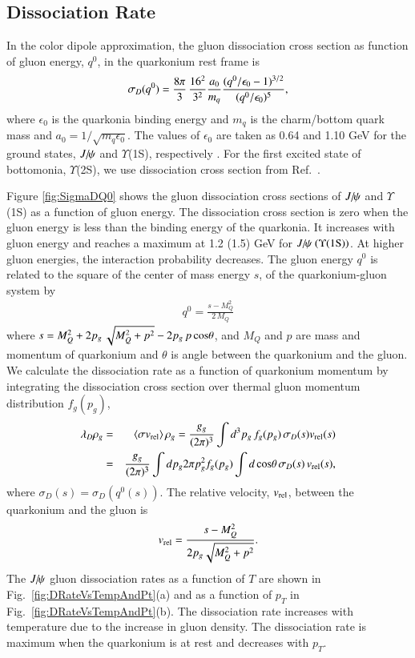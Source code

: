 \documentclass[review]{elsarticle}
\newcommand{\Jpsi}{\ensuremath{J\hspace{-.08em}/\hspace{-.14em}\psi}\xspace} %
\begin{document}
{  \subsection{Dissociation Rate}
  In the color dipole approximation, the gluon dissociation cross section as function of gluon energy, $q^0$,
  in the quarkonium rest frame is~\cite{Bhanot:1979vb}
  \begin{equation}
    \sigma_{D}(q^{0}) = {8\pi \over 3} \, {16^2 \over 3^2} {a_0 \over m_q}  \frac{(q^0/\epsilon_0 - 1)^{3/2}} {(q^0/\epsilon_0)^5},
  \end{equation}
  where $\epsilon_0$ is the quarkonia binding energy and $m_q$ is the charm/bottom quark mass 
  and $a_0=1/\sqrt{m_q\epsilon_0}$.
  The values of $\epsilon_0$ are taken as 0.64 and 1.10 GeV for the ground states, $\Jpsi$ and $\Upsilon$(1S),
  respectively \cite{Karsch:1987pv}.
  For the first excited state of bottomonia, $\Upsilon$(2S), we use dissociation
  cross section from Ref.~\cite{Arleo:2001mp}.
  
  Figure \ref{fig:SigmaDQ0} shows the gluon dissociation cross sections of $\Jpsi$ and $\Upsilon$(1S)
  as a function of gluon energy. The dissociation cross section is zero when the gluon energy is less 
  than the binding energy of the quarkonia. It increases with gluon energy and reaches a maximum at 1.2 (1.5) GeV for 
  $\Jpsi~(\Upsilon(1{\rm S}))$. At higher gluon energies, the interaction probability decreases. The gluon energy $q^0$ 
  is related to the square of the center of mass energy $s$, of the quarkonium-gluon system by
  \begin{eqnarray}
    q^{0} = \frac{s-M_{Q}^{2}}{2\,M_{Q}}
  \end{eqnarray}  
  where $s=M_{Q}^{2} + 2  p_g \, \sqrt{M_{Q}^2 + p^2} - 2  p_g \, p \, {\rm cos\theta}$, and $M_{Q}$ and $p$ 
  are mass and momentum of quarkonium and $\theta$ is angle between the quarkonium and the gluon.
  We calculate the dissociation rate as a function of quarkonium momentum 
  by integrating the dissociation cross section over thermal gluon momentum 
  distribution $f_{g}(p_g)$,   
  \begin{eqnarray}
    \lambda_{D} \rho_{g}  & = & \langle \sigma v_{\rm rel} \rangle \,\rho_{g}  = \frac{g_g}{(2\pi)^{3}} \int d^{3}p_g \, f_{g}(p_g)  \, \sigma_{D}(s) v_{\rm rel}(s)  \nonumber \\ 
    & = & \frac{g_g}{(2\pi)^{3}} \int dp_g 2\pi p_g^{2} f_{g}(p_g) \int d\,{\rm cos\theta}\,\sigma_{D}(s)\,v_{\rm rel}(s),
  \end{eqnarray}
  where $\sigma_{D}(s) = \sigma_{D}(q^0(s))$.
  The relative velocity, $v_{\rm rel}$, between the quarkonium and the gluon is
  \begin{eqnarray}
    v_{\rm rel}  = {s- M_{Q}^{2} \over 2  p_g\sqrt{M_{Q}^2 + p^2}}.  
    \label{eq7}
  \end{eqnarray}
  The $\Jpsi$ gluon dissociation rates as a function of $T$ are shown in 
  Fig.~\ref{fig:DRateVsTempAndPt}(a) and as a function of $p_T$ in Fig.~\ref{fig:DRateVsTempAndPt}(b).
  The dissociation rate increases with temperature due to the increase in gluon density. 
  The dissociation rate is maximum when the quarkonium is at rest and decreases with $p_T$.

}
\end{document}
